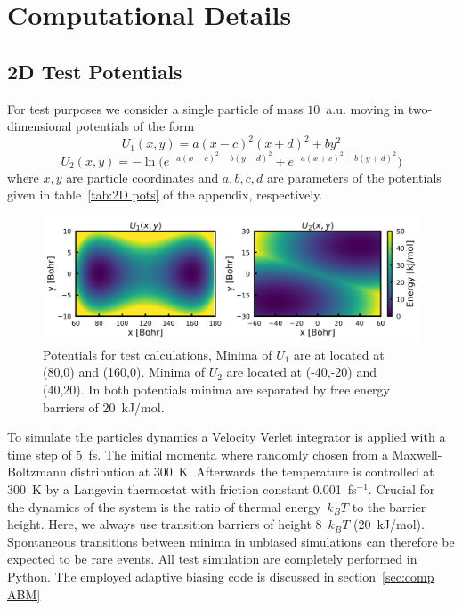 \chapter{Computational Details}
\label{cha:comp}

\section{2D Test Potentials}
\label{sec:comp 2D}
For test purposes we consider a single particle of mass $10$~a.u. moving in two-dimensional potentials of the form
\begin{equation}
  U_1(x,y) = a(x-c)^2(x+d)^2 + by^2 \label{eq:U1}
\end{equation}
\begin{equation}
  U_2(x,y) = -\ln\bigl( e^{-a(x+c)^2 - b(y-d)^2} + e^{-a(x+c)^2 - b(y+d)^2} \bigr) \label{eq:U2}
\end{equation}
where $x,y$ are particle coordinates and $a,b,c,d$ are parameters of the potentials given in table~\ref{tab:2D pots} of the appendix, respectively.
\begin{figure}[H]
    \centering
    \includegraphics[width=1.0\textwidth]{bilder/U}
    \caption{Potentials for test calculations, Minima of $U_1$ are at located at (80,0) and (160,0). Minima of $U_2$ are located at (-40,-20) and (40,20). In both potentials minima are separated by free energy barriers of $20$~kJ/mol.}
\label{fig:potentials}%
\end{figure}
To simulate the particles dynamics a Velocity Verlet\autocite{swope1982computer} integrator is applied with a time step of 5~fs.
The initial momenta where randomly chosen from a Maxwell-Boltzmann distribution at 300~K.
Afterwards the temperature is controlled at 300~K by a Langevin thermostat\autocite{kroger2005models} with friction constant 0.001~fs$^{-1}$.
Crucial for the dynamics of the system is the ratio of thermal energy~$k_B T$ to the barrier height.
Here, we always use transition barriers of height 8~$k_B T$ (20~kJ/mol).
Spontaneous transitions between minima in unbiased simulations can therefore be expected to be rare events.
All test simulation are completely performed in Python. The employed adaptive biasing code is discussed in section~\ref{sec:comp ABM}

